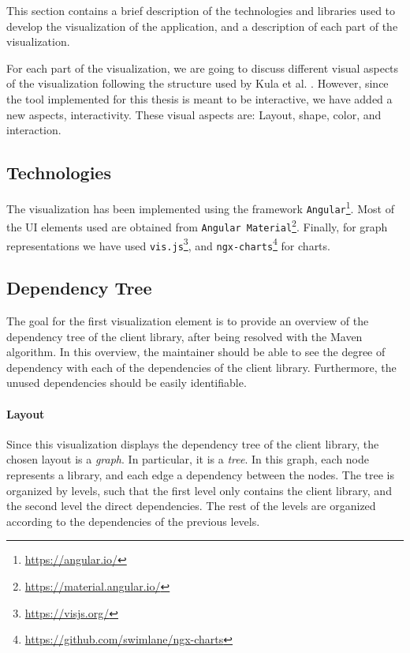 This section contains a brief description of the technologies and libraries used to develop the visualization of the application, and a description of each part of the visualization.

For each part of the visualization, we are going to discuss different visual aspects of the visualization following the structure used by Kula et al. \cite{kula2014visualizing}. However, since the tool implemented for this thesis is meant to be interactive, we have added a new aspects, interactivity. These visual aspects are: Layout, shape, color, and interaction.

\subsection{Technologies}
The visualization has been implemented using the framework \texttt{Angular}\footnote{\url{https://angular.io/}}. Most of the UI elements used are obtained from \texttt{Angular Material}\footnote{\url{https://material.angular.io/}}. Finally, for graph representations we have used \texttt{vis.js}\footnote{\url{https://visjs.org/}}, and \texttt{ngx-charts}\footnote{\url{https://github.com/swimlane/ngx-charts}} for charts.

\subsection{Dependency Tree}\label{sec:visualization-dependency-tree}
The goal for the first visualization element is to provide an overview of the dependency tree of the client library, after being resolved with the Maven algorithm. In this overview, the maintainer should be able to see the degree of dependency with each of the dependencies of the client library. Furthermore, the unused dependencies should be easily identifiable. %

\paragraph{Layout}
Since this visualization displays the dependency tree of the client library, the chosen layout is a \textit{graph}. In particular, it is a \textit{tree}. In this graph, each node represents a library, and each edge a dependency between the nodes. The tree is organized by levels, such that the first level only contains the client library, and the second level the direct dependencies. The rest of the levels are organized according to the dependencies of the previous levels.

